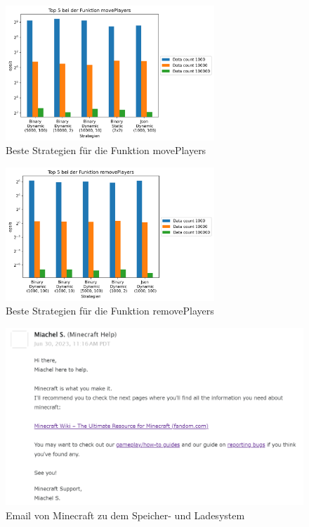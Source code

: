 \begin{figure}[htp]
    \centering
    \includegraphics[width=0.7\textwidth]{images/plots/movePlayers.png}
    \caption{Beste Strategien für die Funktion movePlayers}
    \label{fig:movePlayers}
\end{figure}

\begin{figure}[htp]
    \centering
    \includegraphics[width=0.7\textwidth]{images/plots/removePlayers.png}
    \caption{Beste Strategien für die Funktion removePlayers}
    \label{fig:removePlayers}
\end{figure}

\begin{figure}[htp]
    \centering
    \includegraphics[width=1\textwidth]{images/Minecraft_Email.png}
    \caption{Email von Minecraft zu dem Speicher- und Ladesystem}
    \label{fig:minecraftMail}
\end{figure}


